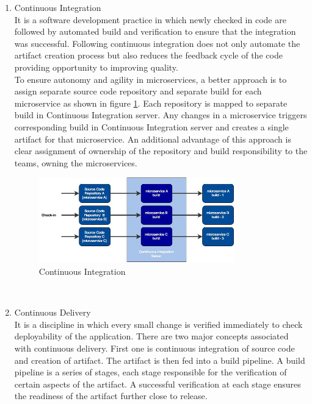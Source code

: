 \begin{enumerate}
\item Continuous Integration \\
It is a software development practice in which newly checked in code are followed by automated build and verification to ensure that the integration was successful. Following continuous integration does not only automate the artifact creation process but also reduces the feedback cycle of the code providing opportunity to improving quality.
\\
To ensure autonomy and agility in microservices, a better approach is to assign separate source code repository and separate build for each microservice as shown in figure \ref{fig:challanges_of_microservices_architecture/deployment/continuous_integration}. Each repository is mapped to separate build in Continuous Integration server. Any changes in a microservice triggers corresponding build in Continuous Integration server and creates a single artifact for that microservice. An additional advantage of this approach is clear assignment of ownership of the repository and build responsibility to the teams, owning the microservices.  \cite{Newman:2015aa} \cite{Fowler:2006ab}
\begin{figure}[H]
\begin{center}
\includegraphics[width=0.8\textwidth]{figures/challenges_five_continuous_integration}
\caption{Continuous Integration \cite{Newman:2015aa}}
\label{fig:challanges_of_microservices_architecture/deployment/continuous_integration}
\end{center}
\end{figure}
\\
\item Continuous Delivery
\\
It is a discipline in which every small change is verified immediately to check deployability of the application. There are two major concepts associated with continuous delivery. First one is continuous integration of source code and creation of artifact. The artifact is then fed into a build pipeline. A build pipeline is a series of stages, each stage responsible for the verification of certain aspects of the artifact. A successful verification at each stage ensures the readiness of the artifact further close to release.

\end{enumerate}

